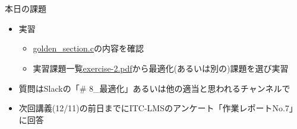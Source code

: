 \documentclass[10pt,dvipdfmx]{beamer}
\begin{document}
\section{}
\begin{frame}[t]{本日の課題}
  \begin{itemize}
  \item 実習
    \begin{itemize}
    \item \href{https://github.com/todo-group/computer-experiments/blob/master/exercise/optimization/golden_section.c}{golden\_section.c}の内容を確認
    \item 実習課題一覧\href{https://github.com/todo-group/ComputerExperiments/releases/tag/2020a-computer2}{exercise-2.pdf}から最適化(あるいは別の)課題を選び実習
    \end{itemize}
  \item 質問はSlackの「\# 8\_最適化」あるいは他の適当と思われるチャンネルで
  \item 次回講義(12/11)の前日までにITC-LMSのアンケート「作業レポートNo.7」に回答
  \end{itemize}
\end{frame}
\end{document}
